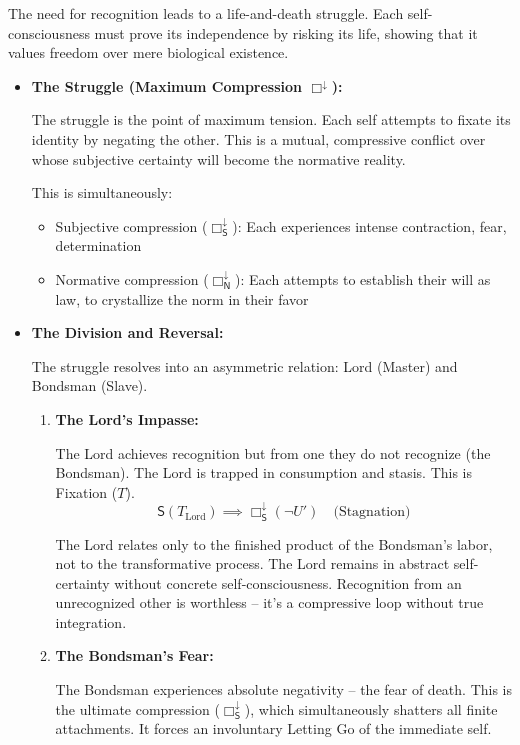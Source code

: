 \documentclass[12pt]{book}
\newcommand{\SBoxDown}{\Box_{\mathsf{S}}^{\downarrow}}
\newcommand{\NBoxDown}{\Box_{\mathsf{N}}^{\downarrow}}
\begin{document}
The need for recognition leads to a life-and-death struggle. Each self-consciousness must prove its independence by risking its life, showing that it values freedom over mere biological existence.

\begin{itemize}
\item \textbf{The Struggle (Maximum Compression $\Box^{\downarrow}$):}

The struggle is the point of maximum tension. Each self attempts to fixate its identity by negating the other. This is a mutual, compressive conflict over whose subjective certainty will become the normative reality.

This is simultaneously:
\begin{itemize}
\item Subjective compression ($\SBoxDown$): Each experiences intense contraction, fear, determination
\item Normative compression ($\NBoxDown$): Each attempts to establish their will as law, to crystallize the norm in their favor
\end{itemize}

\item \textbf{The Division and Reversal:}

The struggle resolves into an asymmetric relation: Lord (Master) and Bondsman (Slave).

\begin{enumerate}
\item \textbf{The Lord's Impasse:}

The Lord achieves recognition but from one they do not recognize (the Bondsman). The Lord is trapped in consumption and stasis. This is Fixation ($T$).
\[
\mathsf{S}(T_{\text{Lord}}) \implies \SBoxDown(\neg U') \quad \text{(Stagnation)}
\]

The Lord relates only to the finished product of the Bondsman's labor, not to the transformative process. The Lord remains in abstract self-certainty without concrete self-consciousness. Recognition from an unrecognized other is worthless -- it's a compressive loop without true integration.

\item \textbf{The Bondsman's Fear:}

The Bondsman experiences absolute negativity -- the fear of death. This is the ultimate compression ($\SBoxDown$), which simultaneously shatters all finite attachments. It forces an involuntary Letting Go of the immediate self.


\end{enumerate}
\end{itemize}
\end{document}
